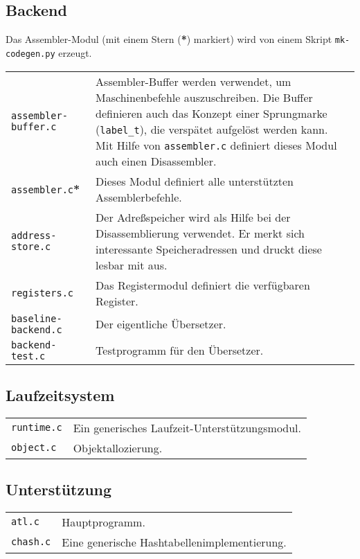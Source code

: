 \documentclass[11pt,a4paper]{article}
\newcommand{\Cty}[1]{\textcolor{dblue}{\texttt{#1}}}
\begin{document}
\subsection{Backend}

Das Assembler-Modul (mit einem  Stern (\textbf{*}) markiert) wird von einem Skript \texttt{mk-codegen.py} erzeugt.

\begin{tabular}{p{4cm}p{12cm}}
\texttt{assembler-buffer.c} & Assembler-Buffer werden verwendet, um Maschinenbefehle auszuschreiben.  Die Buffer definieren auch das Konzept einer Sprungmarke (\Cty{label\_t}), die verspätet aufgelöst werden kann.
Mit Hilfe von \texttt{assembler.c} definiert dieses Modul auch einen Disassembler. \\
\texttt{assembler.c}\textbf{*} & Dieses Modul definiert alle unterstützten Assemblerbefehle. \\
\texttt{address-store.c} & Der Adreßspeicher wird als Hilfe bei der Disassemblierung verwendet.  Er merkt sich interessante Speicheradressen und druckt diese lesbar mit aus. \\
\texttt{registers.c} & Das Registermodul definiert die verfügbaren Register.  \\
\texttt{baseline-backend.c} & Der eigentliche Übersetzer. \\
\texttt{backend-test.c} & Testprogramm für den Übersetzer. \\
\end{tabular}

\subsection{Laufzeitsystem}
\begin{tabular}{p{4cm}p{12cm}}
\texttt{runtime.c} & Ein generisches Laufzeit-Unterstützungsmodul. \\
\texttt{object.c} & Objektallozierung. \\
\end{tabular}

\subsection{Unterstützung}

\begin{tabular}{p{4cm}p{12cm}}
\texttt{atl.c} & Hauptprogramm. \\
\texttt{chash.c} & Eine generische Hashtabellenimplementierung. \\
\end{tabular}
\end{document}
